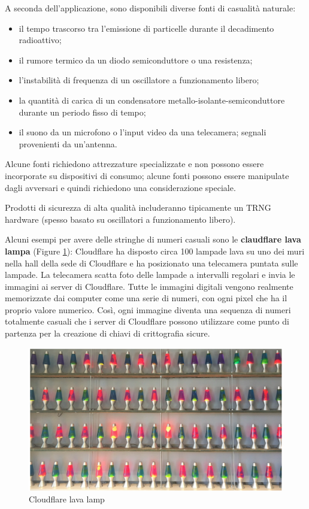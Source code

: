\documentclass[11pt]{article}
\theoremstyle{definition} \newtheorem{definizione}{Definizione}[section] %
\begin{document}
        A seconda dell'applicazione, sono disponibili diverse fonti di casualità naturale:
        \begin{itemize}
        \item il tempo trascorso tra l'emissione di particelle durante il decadimento radioattivo;
        \item il rumore termico da un diodo semiconduttore o una resistenza;
        \item l'instabilità di frequenza di un oscillatore a funzionamento libero;
        \item la quantità di carica di un condensatore metallo-isolante-semiconduttore durante un periodo fisso di tempo;
        \item il suono da un microfono o l'input video da una telecamera; segnali provenienti da un'antenna.
        \end{itemize}

        Alcune fonti richiedono attrezzature specializzate e non possono essere incorporate su dispositivi di consumo; alcune fonti possono essere manipulate dagli avversari e quindi richiedono una considerazione speciale.

        Prodotti di sicurezza di alta qualità includeranno tipicamente un TRNG hardware (spesso basato su oscillatori a funzionamento libero).

        Alcuni esempi per avere delle stringhe di numeri casuali sono le \textbf{claudflare lava lampa} (Figure \ref{fig:figura5}): Cloudflare ha disposto circa 100 lampade lava su uno dei muri nella hall della sede di Cloudflare e ha posizionato una telecamera puntata sulle lampade. La telecamera scatta foto delle lampade a intervalli regolari e invia le immagini ai server di Cloudflare. Tutte le immagini digitali vengono realmente memorizzate dai computer come una serie di numeri, con ogni pixel che ha il proprio valore numerico. Così, ogni immagine diventa una sequenza di numeri totalmente casuali che i server di Cloudflare possono utilizzare come punto di partenza per la creazione di chiavi di crittografia sicure.

        \begin{figure}[H]
            \centering
            \includegraphics[width=0.4\linewidth]{5.png} 
            \caption{Cloudflare lava lamp}\label{fig:figura5}
        \end{figure}
\end{document}
